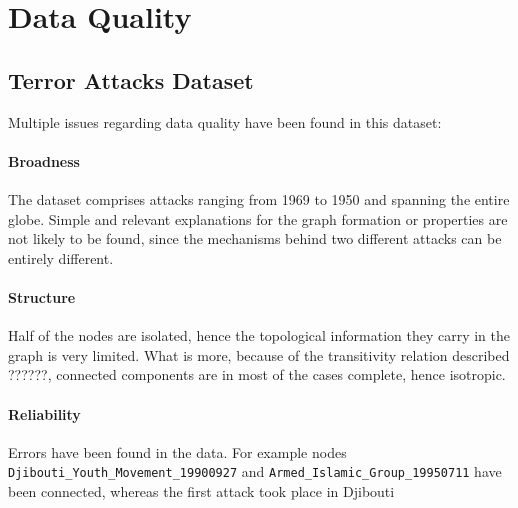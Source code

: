 
\section{Data Quality}
\label{sec:DataQuality}

\subsection{Terror Attacks Dataset}
Multiple issues regarding data quality have been found in this dataset:

\paragraph{Broadness} The dataset comprises attacks ranging from 1969 to 1950 and spanning the entire globe. Simple and relevant explanations for the graph formation or properties are not likely to be found, since the mechanisms behind two different attacks can be entirely different.

\paragraph{Structure} Half of the nodes are isolated, hence the topological information they carry in the graph is very limited. What is more, because of the transitivity relation described ??????, connected components are in most of the cases complete, hence isotropic. 

\paragraph{Reliability} Errors have been found in the data. For example nodes \texttt{Djibouti\_Youth\_Movement\_19900927} and \texttt{Armed\_Islamic\_Group\_19950711} have been connected, whereas the first attack took place in Djibouti~\cite{amnesty1991}
